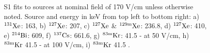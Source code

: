 \begin{figure}[h!]
\bigskip

\hfill
{}
\hfill
{}

\caption{S1 fits to sources at nominal field of 170 V/cm unless otherwise noted. Source and energy in keV from top left to bottom right: a) $\rm ^{131}Xe$: 163, b) $\rm ^{127}Xe$:  207, c) $\rm ^{127}Xe$ \&  $\rm ^{129m}Xe$: 236.8, d)  $\rm ^{127}Xe$: 410, e) $\rm ^{214}Bi$: 609, f) $\rm ^{137}Cs$: 661.6, g) $\rm ^{83m}Kr$: 41.5 - at 50 V/cm, h) $\rm ^{83m}Kr$ 41.5 - at 100 V/cm, i) $\rm ^{83m}Kr$ 41.5 .}
\label{fig:Doke_Fits_S1}
\end{figure}



